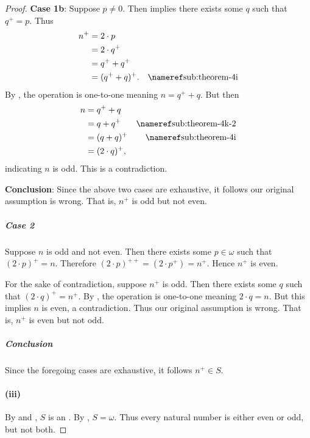\documentclass{report}
\begin{document}
\begin{proof}
      \vspace{8pt}\quad
      \textbf{Case 1b}: Suppose $p \neq 0$.
      Then  implies there exists some $q$ such that
        $q^+ = p$.
      Thus
        \begin{align*}
          n^+
            & = 2 \cdot p \\
            & = 2 \cdot q^+ \\
            & = q^+ + q^+ \\
            & = (q^+ + q)^+. & \textref{sub:theorem-4i}
        \end{align*}
      By , the  operation is
        one-to-one meaning $n = q^+ + q$.
      But then
        \begin{align*}
          n
            & = q^+ + q \\
            & = q + q^+ & \textref{sub:theorem-4k-2} \\
            & = (q + q)^+ & \textref{sub:theorem-4i} \\
            & = (2 \cdot q)^+,
        \end{align*}
        indicating $n$ is odd.
      This is a contradiction.

      \vspace{8pt}\quad
      \textbf{Conclusion}: Since the above two cases are exhaustive, it follows
        our original assumption is wrong.
      That is, $n^+$ is odd but not even.

    \subparagraph{Case 2}%

      Suppose $n$ is odd and not even.
      Then there exists some $p \in \omega$ such that $(2 \cdot p)^+ = n$.
      Therefore $(2 \cdot p)^{++} = (2 \cdot p^+) = n^+$.
      Hence $n^+$ is even.

      For the sake of contradiction, suppose $n^+$ is odd.
      Then there exists some $q$ such that $(2 \cdot q)^+ = n^+$.
      By , the  operation is
        one-to-one meaning $2 \cdot q = n$.
      But this implies $n$ is even, a contradiction.
      Thus our original assumption is wrong.
      That is, $n^+$ is even but not odd.

    \subparagraph{Conclusion}%

      Since the foregoing cases are exhaustive, it follows $n^+ \in S$.

  \paragraph{(iii)}%

    By  and ,
      $S$ is an .
    By , $S = \omega$.
    Thus every natural number is either even or odd, but not both.

\end{proof}
\end{document}
